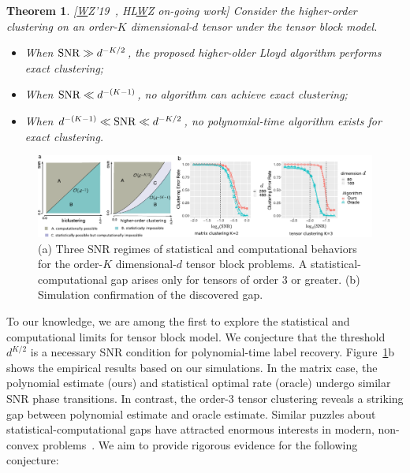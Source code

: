 \documentclass[11pt]{article}
\theoremstyle{exampstyle}
\newtheorem{thm}{Theorem}[section]
\theoremstyle{definition}
\newcommand{\SNR}{{\rm SNR}}
\begin{document}
\begin{thm}\label{thm:informal}[{\underline W}Z'19~\cite{wang2019multiway}, HL{\underline W}Z on-going work]
    Consider the higher-order clustering on an order-$K$ dimensional-$d$ tensor under the tensor block model. 
    \begin{itemize}[wide,labelwidth=!, labelindent=0pt,itemsep=0.1ex,parsep=0ex,topsep=-3pt]
        \item When $\SNR \gg d^{-K/2}$, the proposed higher-older Lloyd algorithm performs exact clustering;
        \item When $\SNR \ll d^{-(K-1)}$, no algorithm can achieve exact clustering;
        \item When $d^{-(K-1)} \ll \SNR \ll d^{-K/2}$, no polynomial-time algorithm exists for exact clustering.    \end{itemize}
\end{thm}


\begin{figure}[htbp]
\vspace{-.2cm}
\includegraphics[width=1\textwidth]{phase-transition.pdf}
\vspace{-.5cm}
\caption{(a) Three SNR regimes of statistical and computational behaviors for the order-$K$ dimensional-$d$ tensor block problems. A statistical-computational gap arises only for tensors of order 3 or greater. (b) Simulation confirmation of the discovered gap.}\label{fig:phase-transition}
\end{figure}

To our knowledge, we are among the first to explore the statistical and computational limits for tensor block model. We conjecture that the threshold $d^{K/2}$ is a necessary SNR condition for polynomial-time label recovery. Figure~\ref{fig:phase-transition}b shows the empirical results based on our simulations. In the matrix case, the polynomial estimate (ours) and statistical optimal rate (oracle) undergo similar SNR phase transitions. In contrast, the order-3 tensor clustering reveals a striking gap between polynomial estimate and oracle estimate. Similar puzzles about statistical-computational gaps have attracted enormous interests in modern, non-convex problems~\cite{ma2015computational,richard2014statistical}. We aim to provide rigorous evidence for the following conjecture:
\end{document}
